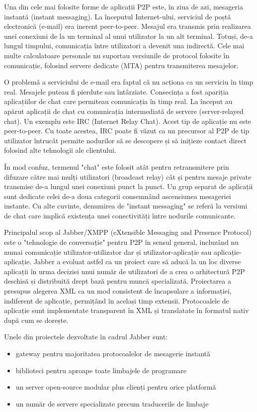 Una din cele mai folosite forme de aplicații P2P este, în ziua de azi,
mesageria instantă (instant messaging). La începutul Internet-ului, serviciul
de poștă electronică (e-mail) era inerent peer-to-peer. Mesajul era transmis
prin realizarea unei conexiuni de la un terminal al unui utilizator la un alt
terminal. Totuși, de-a lungul timpului, comunicația între utilizatori a
devenit una indirectă. Cele mai multe calculatoare personale nu suportau
versiunile de protocol folosite în comunicație, folosind servere dedicate
(MTA) pentru transmiterea mesajelor.

O problemă a serviciului de e-mail era faptul că nu acționa ca un serviciu în
timp real. Mesajele puteau fi pierdute sau întârziate. Consecința a fost
apariția aplicațiilor de chat care permiteau comunicația în timp real. La
început au apărut aplicații de chat cu comunicația intermediată de servere
(server-relayed chat). Un exemplu este IRC (Internet Relay Chat). Acest tip de
aplicație nu este peer-to-peer. Cu toate acestea, IRC poate fi văzut ca un
precursor al P2P de tip utilizator întrucât permite nodurilor să se descopere
și să inițieze contact direct folosind alte tehnologii ale clientului.

În mod confuz, termenul "chat" este folosit atât pentru retransmitere prin
difuzare către mai mulți utilizatori (broadcast relay) cât și pentru mesaje
private transmise de-a lungul unei conexiuni punct la punct. Un grup separat
de aplicații sunt dedicate celei de-a doua categorii consemnând ascensiunea
mesageriei instante. Cu alte cuvinte, denumirea de "instant messaging" se
referă la versiuni de chat care implică existența unei conectivități între
nodurile comunicante.

Principalul scop al Jabber/XMPP (eXtensible Messaging and Presence Protocol)
este o "tehnologie de conversație" pentru P2P în sensul general, incluzând nu
numai comunicație utilizator-utilizator dar și utilizator-aplicație sau
aplicație-aplicație. Jabber a evoluat astfel ca un proiect care să aducă la un
loc diverse aplicații în urma deciziei unui număr de utilizatori de a crea o
arhitectură P2P deschisă și distribuită drept bază pentru muncă specializată.
Proiectarea a presupus alegerea XML ca un mod consistent de încapsulare a
informației, indiferent de aplicație, permițând în același timp extensii.
Protocoalele de aplicație sunt implementate transparent în XML și translatate
în formatul nativ după cum se dorește.

Unele din proiectele dezvoltate în cadrul Jabber sunt:
\begin{itemize}
  \item gateway pentru majoritatea protocoalelor de mesagerie instantă
  \item biblioteci pentru aproape toate limbajele de programare
  \item un server open-source modular plus clienți pentru orice platformă
  \item un număr de servere specializate precum traducerile de limbaje
\end{itemize}

